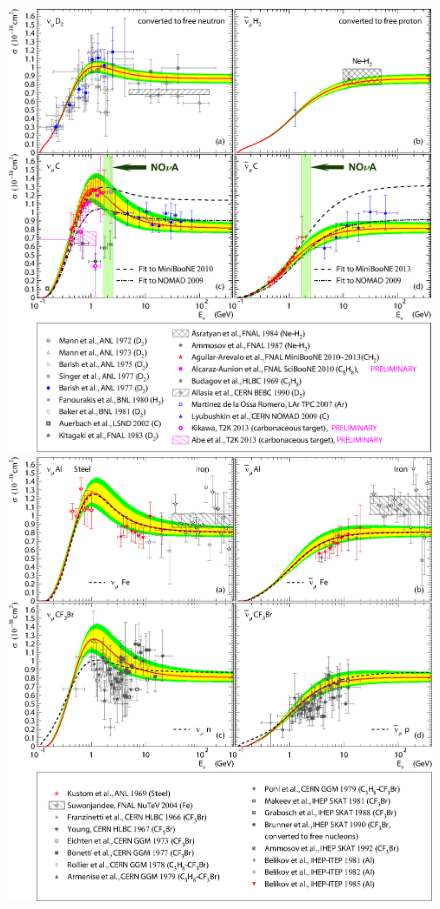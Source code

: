 \begin{figure}[htb!]
\includegraphics[width=\columnwidth]{./QES/sQESCC_101.2.31.301.1b_2_BBBA25_NT_1_NOvA.eps}
\includegraphics[width=\columnwidth]{./QES/sQESCC_101.2.31.301.1b_2_BBBA25_NT_2.eps}

\end{figure}
